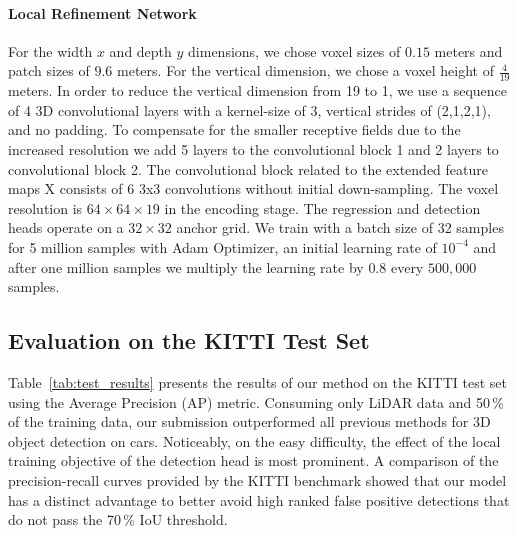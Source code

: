 \documentclass{article}
\begin{document}
\paragraph{Local Refinement Network}
For the width $x$ and depth $y$ dimensions, we chose voxel sizes of $0.15$ meters and patch sizes of $9.6$ meters. For the vertical dimension, we chose a voxel height of $\frac{4}{19}$ meters. In order to reduce the vertical dimension from 19 to 1, we use a sequence of 4 3D convolutional layers with a kernel-size of 3, vertical strides of (2,1,2,1), and no padding. To compensate for the smaller receptive fields due to the increased resolution we add 5 layers to the convolutional block 1 and 2 layers to convolutional block 2. The convolutional block related to the extended feature maps X  consists of 6 3x3 convolutions without initial down-sampling.
The voxel resolution is $64\times64\times19$ in the encoding stage. The regression and detection heads operate on a $32\times32$ anchor grid. 
We train with a batch size of 32 samples for 5 million samples with Adam Optimizer, an initial learning rate of $10^{-4}$ and after one million samples we multiply the learning rate by $0.8$ every $500,000$ samples. 

\subsection{Evaluation on the KITTI Test Set}
Table~\ref{tab:test_results} presents the results of our method on the KITTI test set using the Average Precision (AP) metric. 
Consuming only LiDAR data and 50\,\% of the training data, our submission outperformed all previous methods for 3D object detection on cars. Noticeably, on the easy difficulty, the effect of the local training objective of the detection head is most prominent. A comparison of the precision-recall curves provided by the KITTI benchmark showed that our model has a distinct advantage to better avoid high ranked false positive detections that do not pass the 70\,\% IoU threshold.
\end{document}
